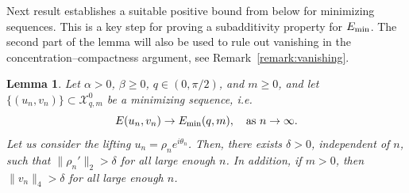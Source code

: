 \documentclass[11pt]{article}
\newcommand{\boX}{\mathcal{X}}
\newcommand{\Emin}{E_\textup{min}}
\theoremstyle{plain}
\newtheorem{lemma}[theorem]{Lemma}
\theoremstyle{definition}
\theoremstyle{remark}
\numberwithin{equation}{section}
\begin{document}
{Next result establishes a suitable positive bound from below for minimizing sequences.
This is a key step for proving a subadditivity property for $\Emin$. The second part of the lemma will also be used to rule out vanishing in the concentration--compactness argument, see Remark~\ref{remark:vanishing}.

\begin{lemma}\label{lemma:delta}
    Let $\alpha>0$, $\beta\geq 0$, $q\in(0,\pi/2)$, and $m\geq 0$, and let $\{(u_n,v_n)\}\subset \boX^0_{q,m}$ be a minimizing sequence, i.e. 
    \begin{equation}\label{eq:minimizingseq}
        E(u_n,v_n)\to\Emin(q,m),\quad\text{as }n\to\infty.
    \end{equation}
    Let us consider the lifting $u_n=\rho_n e^{i\theta_n}$. Then,  there exists $\delta>0$, independent of $n$, such that $\|\rho_n'\|_2>\delta$ for all large enough $n$. In addition, if $m>0$, then $\|v_n\|_4>\delta$ for all large enough $n$.
\end{lemma}

}
\end{document}
